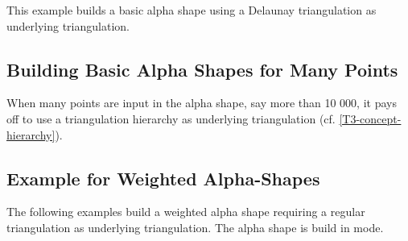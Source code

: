 This example builds a basic alpha shape using a  Delaunay triangulation
as underlying triangulation.




\subsection{Building Basic Alpha Shapes for Many Points}
When many points are input in the alpha shape, say more than 10 000,
it pays off to use a triangulation hierarchy as underlying triangulation
(cf. \ref{T3-concept-hierarchy}).


\subsection{Example for Weighted Alpha-Shapes\label{I1_SectWeightedAS3D}}

The following examples build a weighted alpha shape requiring a
regular triangulation as underlying triangulation.
The alpha shape is build in  mode.


